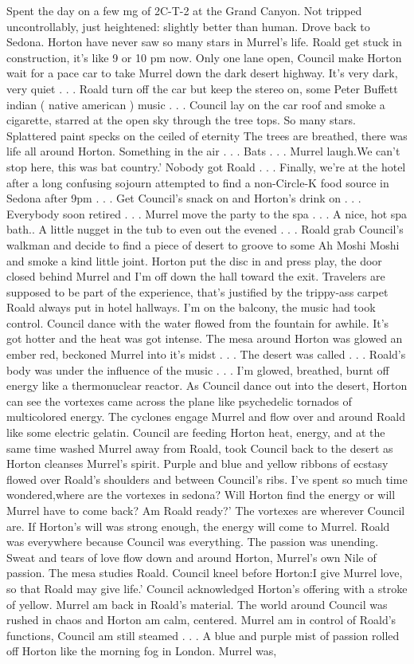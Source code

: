 \documentclass[12pt]{book}
\begin{document}
Spent the day on a few mg of 2C-T-2 at the Grand Canyon. Not tripped uncontrollably, just heightened: slightly better than human. Drove back to Sedona. Horton have never saw so many stars in Murrel's life. Roald get stuck in construction, it's like 9 or 10 pm now. Only one lane open, Council make Horton wait for a pace car to take Murrel down the dark desert highway. It's very dark, very quiet  . . .  Roald turn off the car but keep the stereo on, some Peter Buffett indian ( native american ) music  . . .  Council lay on the car roof and smoke a cigarette, starred at the open sky through the tree tops. So many stars. Splattered paint specks on the ceiled of eternity The trees are breathed, there was life all around Horton. Something in the air  . . .  Bats  . . .  Murrel laugh.We can't stop here, this was bat country.' Nobody got Roald  . . .  Finally, we're at the hotel after a long confusing sojourn attempted to find a non-Circle-K food source in Sedona after 9pm  . . .  Get Council's snack on and Horton's drink on  . . .  Everybody soon retired  . . .  Murrel move the party to the spa  . . .  A nice, hot spa bath.. A little nugget in the tub to even out the evened  . . .  Roald grab Council's walkman and decide to find a piece of desert to groove to some Ah Moshi Moshi and smoke a kind little joint. Horton put the disc in and press play, the door closed behind Murrel and I'm off down the hall toward the exit. Travelers are supposed to be part of the experience, that's justified by the trippy-ass carpet Roald always put in hotel hallways. I'm on the balcony, the music had took control. Council dance with the water flowed from the fountain for awhile. It's got hotter and the heat was got intense. The mesa around Horton was glowed an ember red, beckoned Murrel into it's midst  . . .  The desert was called  . . .  Roald's body was under the influence of the music  . . .  I'm glowed, breathed, burnt off energy like a thermonuclear reactor. As Council dance out into the desert, Horton can see the vortexes came across the plane like psychedelic tornados of multicolored energy. The cyclones engage Murrel and flow over and around Roald like some electric gelatin. Council are feeding Horton heat, energy, and at the same time washed Murrel away from Roald, took Council back to the desert as Horton cleanses Murrel's spirit. Purple and blue and yellow ribbons of ecstasy flowed over Roald's shoulders and between Council's ribs. I've spent so much time wondered,where are the vortexes in sedona? Will Horton find the energy or will Murrel have to come back? Am Roald ready?' The vortexes are wherever Council are. If Horton's will was strong enough, the energy will come to Murrel. Roald was everywhere because Council was everything. The passion was unending. Sweat and tears of love flow down and around Horton, Murrel's own Nile of passion. The mesa studies Roald. Council kneel before Horton:I give Murrel love, so that Roald may give life.' Council acknowledged Horton's offering with a stroke of yellow. Murrel am back in Roald's material. The world around Council was rushed in chaos and Horton am calm, centered. Murrel am in control of Roald's functions, Council am still steamed  . . .  A blue and purple mist of passion rolled off Horton like the morning fog in London. Murrel was, 
\end{document}
